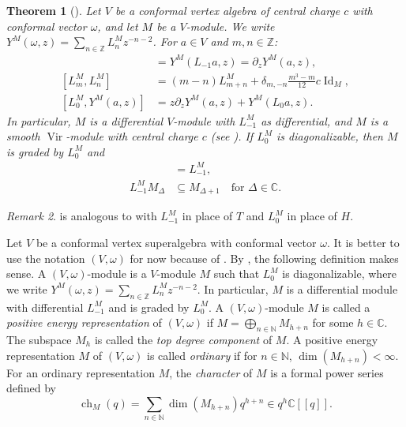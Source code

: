 \documentclass[a4paper, 12pt, reqno]{amsart}
\newtheorem{theorem}{Theorem}[section]
\theoremstyle{remark}
\newtheorem{remark}[theorem]{Remark}
\numberwithin{equation}{subsection}
\DeclareMathOperator{\Vir}{Vir}
\DeclareMathOperator{\Id}{Id}
\DeclareMathOperator{\ch}{ch}
\begin{document}
\begin{theorem}[{\cite[Proposition 4.1.5 and (4.1.18)]{lepowsky_introduction_2004}}]
  \label{thr:27}
  Let $V$ be a conformal vertex algebra of central charge $c$ with conformal vector $\omega$, and let $M$ be a $V$-module.
  We write $Y^M(\omega, z) = \sum_{n \in \mathbb{Z}}L^M_nz^{-n - 2}$.
  For $a \in V$ and $m, n \in \mathbb{Z}$:
  \begin{align*}
    [L^M_{-1}, Y^M(a, z)] &= Y^M(L_{-1}a, z) = \partial_zY^M(a, z), \\
    [L^M_m, L^M_n] &= (m - n)L^M_{m + n} + \delta_{m, -n}\frac{m^3 - m}{12}c\Id_M, \\
    [L^M_0, Y^M(a, z)] &= z\partial_zY^M(a, z) + Y^M(L_0a, z).
  \end{align*}
  In particular, $M$ is a differential $V$-module with $L_{-1}^M $ as differential, and $M$ is a smooth $\Vir$-module with central charge $c$ (see ).
  If $L^M_0$ is diagonalizable, then $M$ is graded by $L_0^M$ and
  \begin{align*}
    [L_0^M, L_{-1}^M] &= L_{-1}^M, \\
    L^M_{-1}M_{\Delta} &\subseteq M_{\Delta + 1} \quad \text{for }\Delta \in \mathbb{C}.
  \end{align*}
\end{theorem}

\begin{remark}
  \label{rmk:23}
   is analogous to  with $L_{-1}^M$ in place of $T$ and $L_0^M$ in place of $H$.
\end{remark}

Let $V$ be a conformal vertex superalgebra with conformal vector $\omega$.
It is better to use the notation $(V, \omega)$ for now because of .
By , the following definition makes sense. A $(V, \omega)$-module is a $V$-module $M$ such that $L^M_0$ is diagonalizable, where we write $Y^M(\omega, z) = \sum_{n \in \mathbb{Z}}L^M_nz^{-n - 2}$.
In particular, $M$ is a differential module with differential $L^M_{-1}$ and is graded by $L^M_0$.
A $(V, \omega)$-module $M$ is called a \emph{positive energy representation} of $(V, \omega)$ if $M = \bigoplus_{n \in \mathbb{N}}M_{h + n}$ for some $h \in \mathbb{C}$.
The subspace $M_h$ is called the \emph{top degree component} of $M$.
A positive energy representation $M$ of $(V, \omega)$ is called \emph{ordinary} if for $n \in \mathbb{N}$, $\dim(M_{h + n}) < \infty$.
For an ordinary representation $M$, the \emph{character} of $M$ is a formal power series defined by
\begin{equation*}
  \ch_M(q) = \sum_{n \in \mathbb{N}}\dim(M_{h + n})q^{h + n} \in q^h\mathbb{C}[[q]].
\end{equation*}
\end{document}
